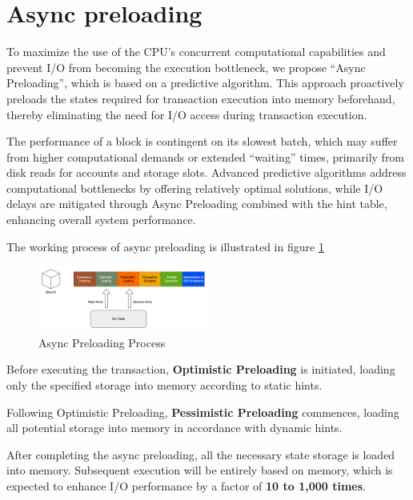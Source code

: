 
\section{Async preloading}

To maximize the use of the CPU's concurrent computational capabilities and prevent I/O from becoming the execution bottleneck, we propose ``Async Preloading'', which is based on a predictive algorithm. This approach proactively preloads the states required for transaction execution into memory beforehand, thereby eliminating the need for I/O access during transaction execution.

The performance of a block is contingent on its slowest batch, which may suffer from higher computational demands or extended ``waiting'' times, primarily from disk reads for accounts and storage slots. Advanced predictive algorithms address computational bottlenecks by offering relatively optimal solutions, while I/O delays are mitigated through Async Preloading combined with the hint table, enhancing overall system performance.

The working process of async preloading is illustrated in figure \ref{fig:async_preloading}

\begin{figure}[htp]
  \centering
  \includegraphics[width=0.5\textwidth]{sections/images/async-preloading.png}
  \caption{Async Preloading Process}
  \label{fig:async_preloading}
\end{figure}

Before executing the transaction, \textbf{Optimistic Preloading} is initiated, loading only the specified storage into memory according to static hints.

Following Optimistic Preloading, \textbf{Pessimistic Preloading} commences, loading all potential storage into memory in accordance with dynamic hints.

After completing the async preloading, all the necessary state storage is loaded into memory. Subsequent execution will be entirely based on memory, which is expected to enhance I/O performance by a factor of \textbf{10 to 1,000 times}.

